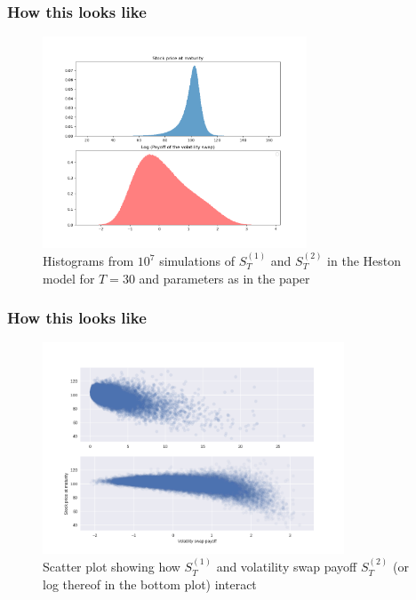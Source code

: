 \documentclass[serif]{beamer}
\begin{document}
\begin{frame}
    \frametitle{How this looks like}
    \begin{figure}
        \includegraphics[width=0.7\textwidth]{./images/vol_swap_payoff.png}
        \caption{
            Histograms from $10^7$ simulations
            of $S^{(1)}_T$ and $S^{(2)}_T$ in the Heston model
            for $T=30$
            and parameters as in the paper
        }
    \end{figure}
\end{frame}

\begin{frame}
    \frametitle{How this looks like}
    \begin{figure}
        \includegraphics[width=0.8\textwidth]{./images/vol_swap_scatter.png}
        \caption{
            Scatter plot showing how $S^{(1)}_T$ and volatility swap
            payoff $S^{(2)}_T$ (or log thereof in the bottom plot) interact
        }
    \end{figure}
\end{frame}
\end{document}
